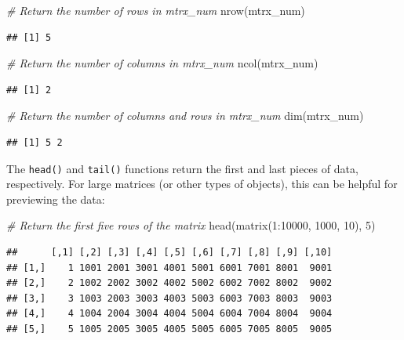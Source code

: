 \documentclass[
]{book}
\newenvironment{Shaded}{\begin{snugshade}}{\end{snugshade}}
\newcommand{\CommentTok}[1]{\textcolor[rgb]{0.56,0.35,0.01}{\textit{#1}}}
\newcommand{\DecValTok}[1]{\textcolor[rgb]{0.00,0.00,0.81}{#1}}
\newcommand{\FunctionTok}[1]{\textcolor[rgb]{0.00,0.00,0.00}{#1}}
\newcommand{\NormalTok}[1]{#1}
\newcommand{\SpecialCharTok}[1]{\textcolor[rgb]{0.00,0.00,0.00}{#1}}
\begin{document}
\begin{Shaded}
\begin{Highlighting}[]
\CommentTok{\# Return the number of rows in mtrx\_num}
\FunctionTok{nrow}\NormalTok{(mtrx\_num)}
\end{Highlighting}
\end{Shaded}

\begin{verbatim}
## [1] 5
\end{verbatim}

\begin{Shaded}
\begin{Highlighting}[]
\CommentTok{\# Return the number of columns in mtrx\_num}
\FunctionTok{ncol}\NormalTok{(mtrx\_num)}
\end{Highlighting}
\end{Shaded}

\begin{verbatim}
## [1] 2
\end{verbatim}

\begin{Shaded}
\begin{Highlighting}[]
\CommentTok{\# Return the number of columns and rows in mtrx\_num}
\FunctionTok{dim}\NormalTok{(mtrx\_num)}
\end{Highlighting}
\end{Shaded}

\begin{verbatim}
## [1] 5 2
\end{verbatim}

The \texttt{head()} and \texttt{tail()} functions return the first and last pieces of data, respectively. For large matrices (or other types of objects), this can be helpful for previewing the data:

\begin{Shaded}
\begin{Highlighting}[]
\CommentTok{\# Return the first five rows of the matrix}
\FunctionTok{head}\NormalTok{(}\FunctionTok{matrix}\NormalTok{(}\DecValTok{1}\SpecialCharTok{:}\DecValTok{10000}\NormalTok{, }\DecValTok{1000}\NormalTok{, }\DecValTok{10}\NormalTok{), }\DecValTok{5}\NormalTok{)}
\end{Highlighting}
\end{Shaded}

\begin{verbatim}
##      [,1] [,2] [,3] [,4] [,5] [,6] [,7] [,8] [,9] [,10]
## [1,]    1 1001 2001 3001 4001 5001 6001 7001 8001  9001
## [2,]    2 1002 2002 3002 4002 5002 6002 7002 8002  9002
## [3,]    3 1003 2003 3003 4003 5003 6003 7003 8003  9003
## [4,]    4 1004 2004 3004 4004 5004 6004 7004 8004  9004
## [5,]    5 1005 2005 3005 4005 5005 6005 7005 8005  9005
\end{verbatim}
\end{document}
